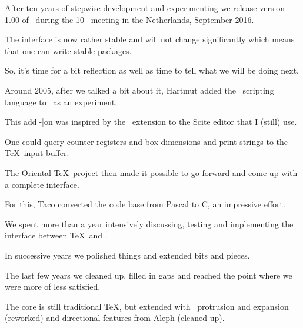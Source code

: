
\startdocument
  [title={\luaTeX},
   subtitle={Version 1.00},
   location={ConTeXt meeting \emdash\ September 2016},
   mp:title={luatex},
   mp:subtitle={1.00\space\endash\space2016}]

\startstandardmakeup

After ten years of stepwise development and experimenting we release version 1.00
of \LuaTeX\ during the 10 \ConTeXt\ meeting in the Netherlands, September
2016.

The interface is now rather stable and will not change significantly which means
that one can write stable packages.

So, it's time for a bit reflection as well as time to tell what we will be doing
next.

\stopstandardmakeup

\startstandardmakeup

Around 2005, after we talked a bit about it, Hartmut added the \Lua\ scripting
language to \pdfTeX\ as an experiment.

This add|-|on was inspired by the \Lua\ extension to the Scite editor that I
(still) use.

\stopstandardmakeup

\startstandardmakeup

One could query counter registers and box dimensions and print strings to the
\TeX\ input buffer.

The Oriental \TeX\ project then made it possible to go forward and come up with a
complete interface.

For this, Taco converted the code base from Pascal to C, an impressive effort.

\stopstandardmakeup

\startstandardmakeup

We spent more than a year intensively discussing, testing and implementing
the interface between \TeX\ and \Lua.

In successive years we polished things and extended bits and pieces.

The last few years we cleaned up, filled in gaps and reached the point where we
were more of less satisfied.

\stopstandardmakeup

\startstandardmakeup

The core is still traditional \TeX, but extended with \pdfTeX\ protrusion and
expansion (reworked) and directional features from Aleph (cleaned up).

